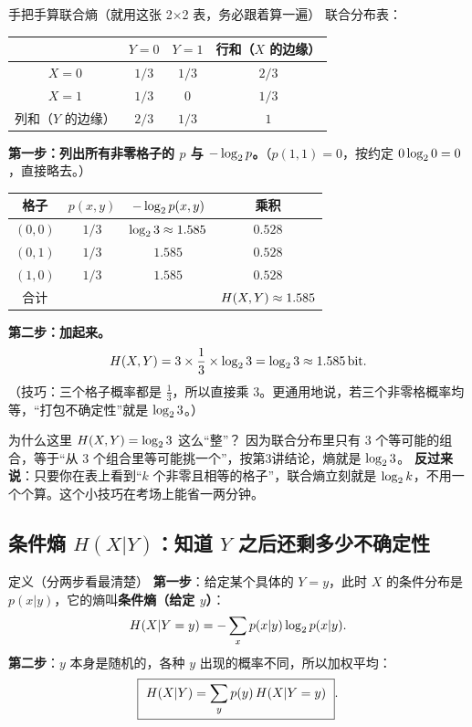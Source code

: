 \begin{calc}{手把手算联合熵（就用这张 2×2 表，务必跟着算一遍）}
联合分布表：
\begin{center}
\renewcommand{\arraystretch}{1.3}
\begin{tabular}{c|cc|c}
\toprule
 & $Y=0$ & $Y=1$ & 行和（$X$ 的边缘）\\
\midrule
$X=0$ & $1/3$ & $1/3$ & $2/3$\\
$X=1$ & $1/3$ & $0$ & $1/3$\\
\midrule
列和（$Y$ 的边缘） & $2/3$ & $1/3$ & $1$\\
\bottomrule
\end{tabular}
\end{center}

\textbf{第一步：列出所有非零格子的 $p$ 与 $-\log_{2} p$。}（$p(1,1)=0$，按约定 $0\log_{2}0=0$，直接略去。）
\begin{center}
\renewcommand{\arraystretch}{1.3}
\begin{tabular}{c|c|c|c}
\toprule
格子 & $p(x,y)$ & $-\log_{2} p(x,y)$ & 乘积\\
\midrule
$(0,0)$ & $1/3$ & $\log_{2}3\approx1.585$ & $0.528$\\
$(0,1)$ & $1/3$ & $1.585$ & $0.528$\\
$(1,0)$ & $1/3$ & $1.585$ & $0.528$\\
\midrule
合计 & & & $H\!\left(X,Y\right)\approx1.585$\\
\bottomrule
\end{tabular}
\end{center}

\textbf{第二步：加起来。}
\[
H\!\left(X,Y\right)=3\times\frac13\times\log_{2}3=\log_{2}3\approx1.585\,\text{bit} .
\]
（技巧：三个格子概率都是 $\frac13$，所以直接乘 3。更通用地说，若三个非零格概率均等，“打包不确定性”就是 $\log_{2}3$。）
\end{calc}

\begin{qa}{为什么这里 $H(X,Y)=\log_{2}3$ 这么“整”？}
因为联合分布里只有 3 个等可能的组合，等于“从 3 个组合里等可能挑一个”，按第3讲结论，熵就是 $\log_{2}3$。
\textbf{反过来说}：只要你在表上看到“$k$ 个非零且相等的格子”，联合熵立刻就是 $\log_{2} k$，不用一个个算。这个小技巧在考场上能省一两分钟。
\end{qa}

\subsection{条件熵 $H(X|Y)$：知道 $Y$ 之后还剩多少不确定性}

\begin{defbox}{定义（分两步看最清楚）}
\textbf{第一步}：给定某个具体的 $Y=y$，此时 $X$ 的条件分布是 $p(x|y)$，它的熵叫\textbf{条件熵（给定 $y$）}：
\[
H\!\left(X|Y=y\right)=-\sum_{x}p(x|y)\log_{2} p(x|y).
\]
\textbf{第二步}：$y$ 本身是随机的，各种 $y$ 出现的概率不同，所以加权平均：
\[
\boxed{\ \Hx{X|Y}=\sum_{y}p(y)\,\Hx{X|Y=y}\ }.
\]
\end{defbox}

